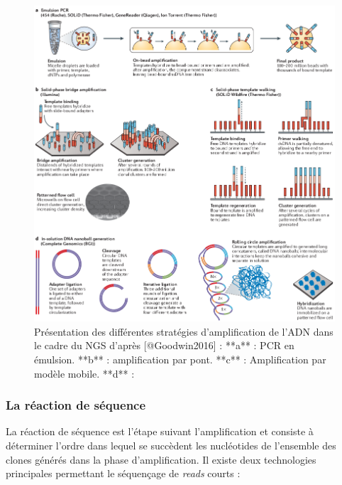 \documentclass[12pt,twoside]{reedthesis}
\theoremstyle{definition}
\theoremstyle{definition}
\theoremstyle{remark}
\begin{document}
  \begin{figure}
  
  {\centering \includegraphics[scale=.455]{figure/ngs_amplification} 
  
  }
  
  \caption[Présentation des différentes stratégies d'amplification de l'ADN dans le cadre du NGS]{Présentation des différentes stratégies d'amplification de l'ADN dans le cadre du NGS d'après [@Goodwin2016] : **a** : PCR en émulsion. **b** : amplification par pont. **c** : Amplification par modèle mobile. **d** : }\label{fig:ngsampli}
  \end{figure}
  
  \newpage
  
  \subsubsection{La réaction de séquence}\label{la-reaction-de-sequence}
  
  La réaction de séquence est l'étape suivant l'amplification et consiste
  à déterminer l'ordre dans lequel se succèdent les nucléotides de
  l'ensemble des clones générés dans la phase d'amplification. Il existe
  deux technologies principales permettant le séquençage de \emph{reads}
  courts :\\
  
\end{document}
